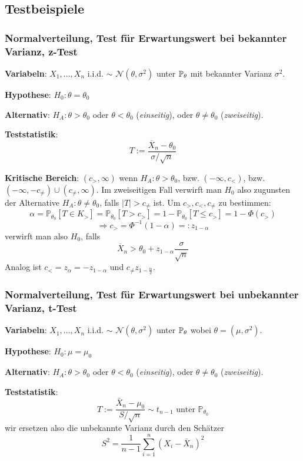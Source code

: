 \subsection{Testbeispiele}
\subsubsection*{Normalverteilung, Test für Erwartungswert bei bekannter Varianz, z-Test}

\textbf{Variabeln}: $X_1, \ldots , X_n$ i.i.d. $\sim$ $\mathcal{N}(\theta, \sigma^2)$ unter $\mathbb{P}_\theta$ mit bekannter Varianz $\sigma^2$.

\textbf{Hypothese}: $H_0 : \theta = \theta_0$

\textbf{Alternativ}: $H_A : \theta > \theta_0$ oder $\theta < \theta_0$ (\textit{einseitig}), oder $\theta \neq \theta_0$ (\textit{zweiseitig}).

\textbf{Teststatistik}: $$T := \frac{\overline{X}_n - \theta_0}{\sigma / \sqrt{n}}$$

\textbf{Kritische Bereich}: $(c_>, \infty)$ wenn $H_A : \theta > \theta_0$, bzw. $(-\infty, c_<)$, bzw. $(-\infty, -c_\neq) \cup (c_\neq, \infty)$. Im zweiseitigen Fall verwirft man $H_0$ also zugunsten der Alternative $H_A : \theta \neq \theta_0$, falls $|T| > c_\neq$ ist.
Um $c_>, c_<, c_\neq$ zu bestimmen:
$$\alpha=\mathbb{P}_{\theta_{0}}\left[T \in K_{>}\right]=\mathbb{P}_{\theta_{0}}\left[T>c_{>}\right]=1-\mathbb{P}_{\theta_{0}}\left[T \leq c_{>}\right]=1-\Phi\left(c_{>}\right)$$ $$\Rightarrow c_> = \Phi^{-1}(1- \alpha) =: z_{1 - \alpha}$$
verwirft man also $H_{0}$, falls
$$
\overline{X}_{n}>\theta_{0}+z_{1-\alpha} \frac{\sigma}{\sqrt{n}}
$$
Analog ist $c_< = z_\alpha = -z_{1-\alpha}$ und $c_\neq z_{1 - \frac{\alpha}{2}}$.

\subsubsection*{Normalverteilung, Test für Erwartungswert bei unbekannter Varianz, t-Test}

\textbf{Variabeln}: $X_1, \ldots , X_n$ i.i.d. $\sim$ $\mathcal{N}(\theta, \sigma^2)$ unter $\mathbb{P}_\theta$ wobei $\theta = (\mu, \sigma^2)$.

\textbf{Hypothese}: $H_0 : \mu = \mu_0$

\textbf{Alternativ}: $H_A : \theta > \theta_0$ oder $\theta < \theta_0$ (\textit{einseitig}), oder $\theta \neq \theta_0$ (\textit{zweiseitig}).

\textbf{Teststatistik}:
$$
T:=\frac{\bar{X}_{n}-\mu_{0}}{S / \sqrt{n}} \sim t_{n-1} \text { unter } \mathbb{P}_{\theta_{0}}
$$
wir ersetzen also die unbekannte Varianz durch den Schätzer
$$
S^{2}=\frac{1}{n-1} \sum_{i=1}^{n}\left(X_{i}-\bar{X}_{n}\right)^{2}
$$

